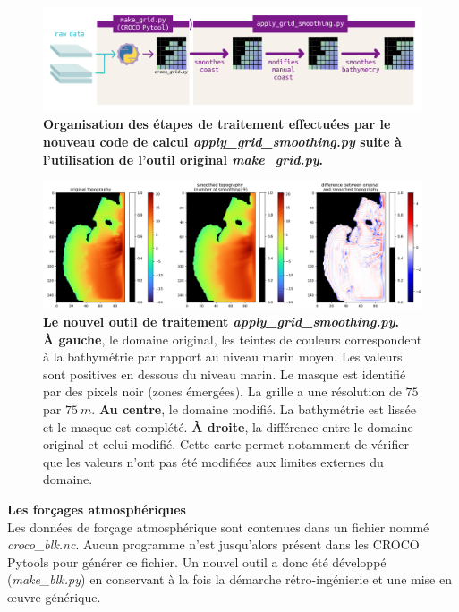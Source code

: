 \documentclass[10pt,a4paper,titlepage]{article}
\begin{document}
\begin{figure}[H]
    \centering
    \includegraphics[scale=0.65]{../images/workflow/grid_smoothing.pdf}
    \caption{\textbf{Organisation des étapes de traitement effectuées par le nouveau code de calcul \textit{apply\_grid\_smoothing.py} suite à l'utilisation de l'outil original \textit{make\_grid.py}.}}
    \label{fig:new_smooth_work}

\end{figure}
\begin{figure}[H]
    \centering
    \includegraphics[scale=0.35]{../images/grid_smoothing_adcl5_9.png}
    \caption{
        \textbf{Le nouvel outil de traitement \textit{apply\_grid\_smoothing.py}.}\\
        \textbf{À gauche}, le domaine original, les teintes de couleurs correspondent à la bathymétrie par rapport au niveau marin moyen.
        Les valeurs sont positives en dessous du niveau marin.
        Le masque est identifié par des pixels noir (zones émergées).
        La grille a une résolution de $75$ par $75~m$.
        \textbf{Au centre}, le domaine modifié.
        La bathymétrie est lissée et le masque est complété.
        \textbf{À droite}, la différence entre le domaine original et celui modifié.
        Cette carte permet notamment de vérifier que les valeurs n'ont pas été modifiées aux limites externes du domaine.
    }
    \label{fig:new_smooth}
\end{figure}




\textbf{Les forçages atmosphériques}\\
Les données de forçage atmosphérique sont contenues dans un fichier nommé \textit{croco\_blk.nc}.
Aucun programme n'est jusqu'alors présent dans les CROCO Pytools pour générer ce fichier.
Un nouvel outil a donc été développé (\textit{make\_blk.py}) en conservant à la fois la démarche rétro-ingénierie et une mise en \oe{}uvre générique.
\end{document}
